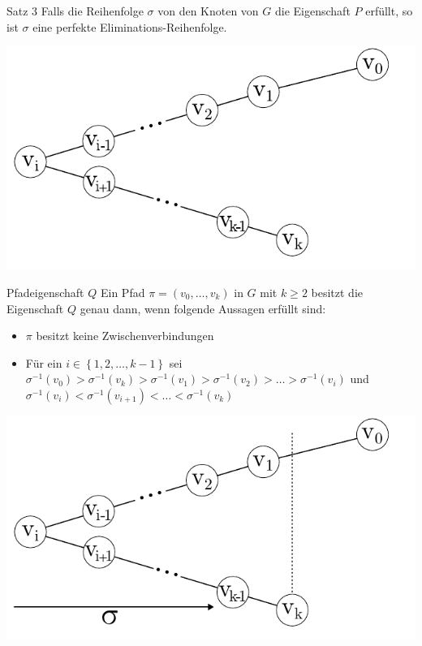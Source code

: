 \documentclass[xcolor=x11names,compress]{beamer}
\begin{document}
\begin{frame}
	\begin{block}{Satz 3}
		Falls die Reihenfolge \( \sigma \) von den Knoten von \( G \) die Eigenschaft \( P \) erfüllt, so ist \( \sigma \) eine perfekte Eliminations-Reihenfolge.
	\end{block}
	\begin{center}
		\begin{overprint}
			\includegraphics[scale=1.0]{img/graph/q/01-01.pdf}
			\onslide<3-5>\begin{block}{Pfadeigenschaft \( Q \)}
				Ein Pfad \( \pi = \left( v_0, \ldots, v_k \right) \) in \( G \) mit \( k \geq 2 \) besitzt die Eigenschaft \( Q \) genau dann, wenn folgende Aussagen erfüllt sind:
				\begin{itemize}
					\item<4-5> \( \pi \) besitzt keine Zwischenverbindungen
					\item<5> Für ein \( i \in \left\lbrace 1, 2, \ldots, k - 1 \right\rbrace \) sei \( \sigma^{-1} \left( v_0 \right) > \sigma^{-1} \left( v_k \right) > \sigma^{-1} \left( v_1 \right)  >  \sigma^{-1} \left( v_2 \right) > \ldots > \sigma^{-1} \left( v_i \right) \) und \( \sigma^{-1} \left( v_i \right) < \sigma^{-1} \left( v_{i + 1} \right) < \ldots < \sigma^{-1} \left( v_k \right) \)
				\end{itemize}
			\end{block}
			\includegraphics[scale=1.0]{img/graph/q/01-02.pdf}

\end{overprint}
\end{center}
\end{frame}
\end{document}
